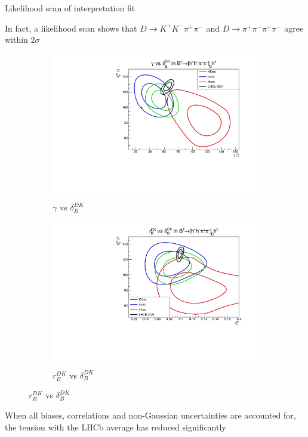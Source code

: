 \documentclass[xcolor={dvipsnames}]{beamer}
\begin{document}
\begin{frame}{Likelihood scan of interpretation fit}
  \begin{center}
    In fact, a likelihood scan shows that $D\to K^+K^-\pi^+\pi^-$ and $D\to\pi^+\pi^-\pi^+\pi^-$ agree within $2\sigma$
  \end{center}
  \begin{figure}
    \centering
    \begin{subfigure}{0.50\textwidth}
      \centering
      \includegraphics[width=1.0\textwidth]{Plots/gamma_deltaB_hhpipi_LHCb_Prob_scan.pdf}
      \caption*{$\gamma$ vs $\delta_B^{DK}$}
    \end{subfigure}%
    \begin{subfigure}{0.50\textwidth}
      \centering
      \includegraphics[width=1.0\textwidth]{Plots/rB_deltaB_hhpipi_LHCb_Prob_scan.pdf}
      \caption*{$r_B^{DK}$ vs $\delta_B^{DK}$}
    \end{subfigure}
  \end{figure}
  \vspace{-0.3cm}
  \begin{center}
    When all biases, correlations and non-Gaussian uncertainties are accounted for, the tension with the LHCb average has reduced significantly
  \end{center}
\end{frame}
\end{document}
